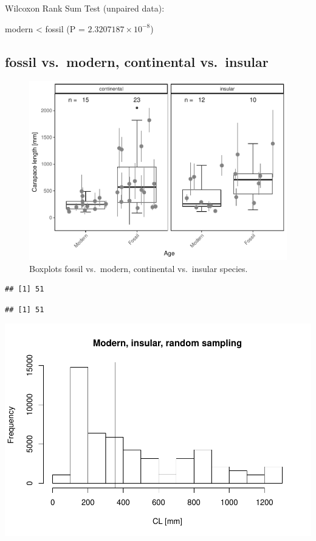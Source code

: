 \documentclass[]{article}
\begin{document}
Wilcoxon Rank Sum Test (unpaired data):

modern \textless{} fossil (P = \(2.3207187\times 10^{-8}\))

\newpage

\subsection{fossil vs.~modern, continental
vs.~insular}\label{fossil-vs.modern-continental-vs.insular}

\begin{figure}[htbp]
\centering
\includegraphics{MA_JJ_files/figure-latex/BPFMCI-1.pdf}
\caption{Boxplots fossil vs.~modern, continental vs.~insular species.}
\end{figure}

\begin{verbatim}
## [1] 51
\end{verbatim}

\begin{verbatim}
## [1] 51
\end{verbatim}

\includegraphics{MA_JJ_files/figure-latex/RSMFCI-1.pdf}
\end{document}
